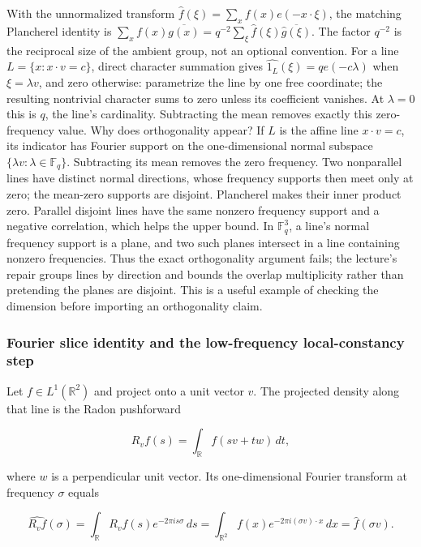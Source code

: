 With the unnormalized transform \(\widehat f(\xi)=\sum_x f(x)e(-x\cdot\xi)\), the matching Plancherel identity is \(\sum_x f(x)\overline{g(x)}=q^{-2}\sum_\xi\widehat f(\xi)\overline{\widehat g(\xi)}\). The factor \(q^{-2}\) is the reciprocal size of the ambient group, not an optional convention. For a line \(L=\{x:x\cdot v=c\}\), direct character summation gives \(\widehat{1_L}(\xi)=q e(-c\lambda)\) when \(\xi=\lambda v\), and zero otherwise: parametrize the line by one free coordinate; the resulting nontrivial character sums to zero unless its coefficient vanishes. At \(\lambda=0\) this is \(q\), the line's cardinality. Subtracting the mean removes exactly this zero-frequency value. Why does orthogonality appear? If \(L\) is the affine line \(x\cdot v=c\), its indicator has Fourier support on the one-dimensional normal subspace \(\{\lambda v:\lambda\in\mathbb F_q\}\). Subtracting its mean removes the zero frequency. Two nonparallel lines have distinct normal directions, whose frequency supports then meet only at zero; the mean-zero supports are disjoint. Plancherel makes their inner product zero. Parallel disjoint lines have the same nonzero frequency support and a negative correlation, which helps the upper bound. In \(\mathbb F_q^3\), a line's normal frequency support is a plane, and two such planes intersect in a line containing nonzero frequencies. Thus the exact orthogonality argument fails; the lecture's repair groups lines by direction and bounds the overlap multiplicity rather than pretending the planes are disjoint. This is a useful example of checking the dimension before importing an orthogonality claim.

\subsubsection{Fourier slice identity and the low-frequency local-constancy step}\label{fourier-slice-identity-and-the-low-frequency-local-constancy-step}

Let \(f\in L^1(\mathbb R^2)\) and project onto a unit vector \(v\). The projected density along that line is the Radon pushforward

\[R_vf(s)=\int_{\mathbb R}f(sv+tw)\,dt,\]

where \(w\) is a perpendicular unit vector. Its one-dimensional Fourier transform at frequency \(\sigma\) equals

\[\widehat{R_vf}(\sigma)=\int_{\mathbb R}R_vf(s)e^{-2\pi i s\sigma}\,ds=\int_{\mathbb R^2}f(x)e^{-2\pi i (\sigma v)\cdot x}\,dx=\widehat f(\sigma v).\]

